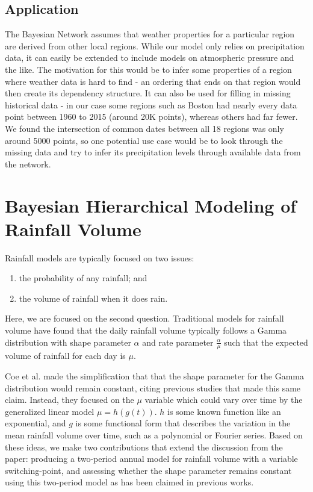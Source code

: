 \documentclass{article}
\begin{document}
\subsection{Application}
The Bayesian Network assumes that weather properties for a particular region are derived from other local regions. While our model only relies on precipitation data, it can easily be extended to include models on atmospheric pressure and the like. The motivation for this would be to infer some properties of a region where weather data is hard to find - an ordering that ends on that region would then create its dependency structure. It can also be used for filling in missing historical data - in our case some regions such as Boston had nearly every data point between 1960 to 2015 (around 20K points), whereas others had far fewer. We found the intersection of common dates between all 18 regions was only around 5000 points, so one potential use case would be to look through the missing data and try to infer its precipitation levels through available data from the network.

\section{Bayesian Hierarchical Modeling of Rainfall Volume}
Rainfall models are typically focused on two issues: 
\begin{enumerate}
\item the probability of any rainfall; and
\item the volume of rainfall when it does rain.
\end{enumerate}
Here, we are focused on the second question. Traditional models for rainfall volume have found that the daily rainfall volume typically follows a Gamma distribution with shape parameter $\alpha$ and rate parameter $\frac{\alpha}{\mu}$ such that the expected volume of rainfall for each day is $\mu$. \cite{buishand}

Coe et al. \cite{coe} made the simplification that that the shape parameter for the Gamma distribution would remain constant, citing previous studies that made this same claim. Instead, they focused on the $\mu$ variable  which could vary over time by the generalized linear model $\mu = h( g(t) )$. $h$ is some known function like an exponential, and $g$ is some functional form that describes the variation in the mean rainfall volume over time, such as a polynomial or Fourier series. Based on these ideas, we make two contributions that extend the discussion from the paper: producing a two-period annual model for rainfall volume with a variable switching-point, and assessing whether the shape parameter remains constant using this two-period model as has been claimed in previous works.
\end{document}
